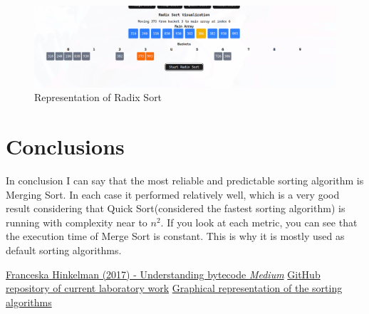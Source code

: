 \documentclass[12pt]{article}
\begin{document}
\begin{figure}[h]
    \centering
    \includegraphics[width=1\textwidth]{radix_im.png}
    \caption{Representation of Radix Sort}
\end{figure}
\clearpage
\section*{Conclusions}
\hspace{0.6cm} 
In conclusion I can say that the most reliable and predictable sorting algorithm is Merging Sort.
In each case it performed relatively well, which is a very good result considering 
that Quick Sort(considered the fastest sorting algorithm) is running with 
complexity near to $n^2$. If you look at each metric, you can see that the execution time of
Merge Sort is constant. This is why it is mostly used as default sorting algorithms.

\begin{thebibliography}{9}

   \href{https://medium.com/dailyjs/understanding-v8s-bytecode-317d46c94775}{Franceska
      Hinkelman (2017) - Understanding bytecode \emph{Medium}}
   \href{https://github.com/DdimaPos/AA-labs/tree/main/Lab2}{GitHub repository of current laboratory work}
   \href{https://sorting-algorithms-visualizer-rho.vercel.app/}{Graphical representation of the sorting algorithms}
\end{thebibliography}
\end{document}
